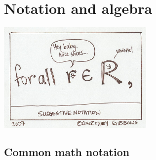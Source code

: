 \documentclass[20pt]{extarticle}
\begin{document}
\section{Notation and algebra}

\begin{center}
\includegraphics[width=3in]{notation}
\end{center}

\subsection{Common math notation}
\end{document}
